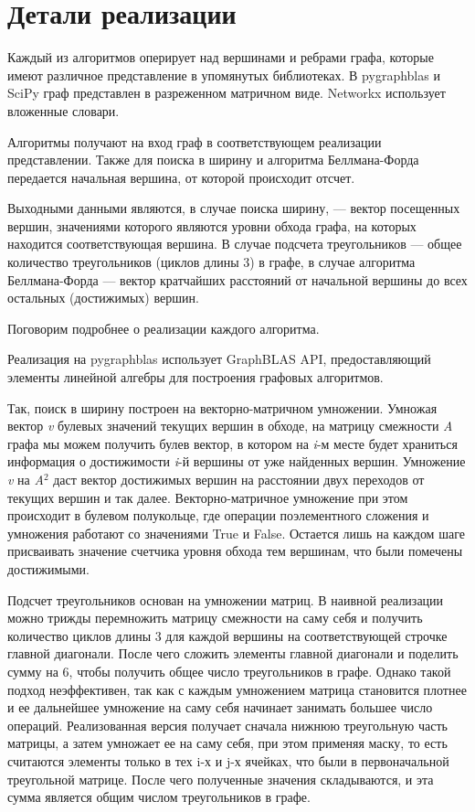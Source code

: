 \section{Детали реализации}
Каждый из алгоритмов оперирует над вершинами и ребрами графа, которые имеют различное представление в упомянутых 
библиотеках. В pygraphblas и SciPy граф представлен в разреженном матричном виде. Networkx использует вложенные 
словари.

Алгоритмы получают на вход граф в соответствующем реализации представлении. Также для поиска в ширину и алгоритма 
Беллмана-Форда передается начальная вершина, от которой происходит отсчет.

Выходными данными являются, в случае поиска ширину, --- вектор посещенных вершин, значениями которого являются 
уровни обхода графа, на которых находится соответствующая вершина. В случае подсчета треугольников --- общее 
количество треугольников (циклов длины 3) в графе, в случае алгоритма Беллмана-Форда --- вектор кратчайших 
расстояний от начальной вершины до всех остальных (достижимых) вершин.

Поговорим подробнее о реализации каждого алгоритма.

Реализация на pygraphblas использует GraphBLAS API, предоставляющий элементы линейной алгебры для построения 
графовых алгоритмов.

Так, поиск в ширину построен на векторно-матричном умножении. Умножая вектор \emph{v} булевых значений 
текущих вершин в обходе, на матрицу смежности \emph{A} графа мы можем получить булев вектор, в котором на 
\emph{i}-м месте будет храниться информация о достижимости \emph{i}-й вершины от уже найденных вершин. 
Умножение \emph{v} на \emph{A}$^2$ даст вектор достижимых вершин на расстоянии двух переходов от текущих 
вершин и так далее. Векторно-матричное умножение при этом происходит в булевом полукольце, где операции 
поэлементного сложения и умножения работают со значениями True и False. Остается лишь на каждом шаге присваивать 
значение счетчика уровня обхода тем вершинам, что были помечены достижимыми.

Подсчет треугольников основан на умножении матриц. В наивной реализации можно трижды перемножить матрицу смежности 
на саму себя и получить количество циклов длины 3 для каждой вершины на соответствующей строчке главной диагонали. 
После чего сложить элементы главной диагонали и поделить сумму на 6, чтобы получить общее число треугольников в 
графе. Однако такой подход неэффективен, так как с каждым умножением матрица становится плотнее и ее дальнейшее 
умножение на саму себя начинает занимать большее число операций. Реализованная версия получает сначала нижнюю 
треугольную часть матрицы, а затем умножает ее на саму себя, при этом применяя маску, то есть считаются элементы 
только в тех i-х и j-х ячейках, что были в первоначальной треугольной матрице. После чего полученные значения 
складываются, и эта сумма является общим числом треугольников в графе.

